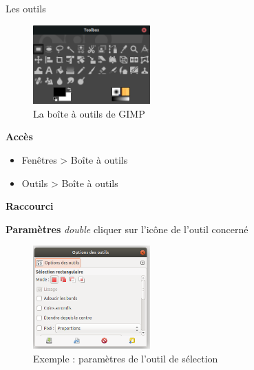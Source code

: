 \documentclass[10pt,svgnames,usenames,table]{beamer}
\begin{document}
\begin{frame}[allowframebreaks]{Les outils}

	\begin{figure}
	    	\centering
	    	\includegraphics[width=0.4\textwidth]{Images/gimp_toolbox}
	    	\caption{La boîte à outils de GIMP} 
		\end{figure}

	\textbf{Accès}

	\begin{itemize}
		\item Fenêtres > Boîte à outils
		\item Outils > Boîte à outils
	\end{itemize}

	\vspace{0.2cm}
	\textbf{Raccourci} 

	\framebreak
	\textbf{Paramètres} \textit{double} cliquer sur l'icône de l'outil concerné
	\begin{figure}
	    	\centering
	    	\includegraphics[width=0.4\textwidth]{Images/option_outil}
	    	\caption{Exemple : paramètres de l'outil de sélection} 
		\end{figure}

\end{frame}
\end{document}
